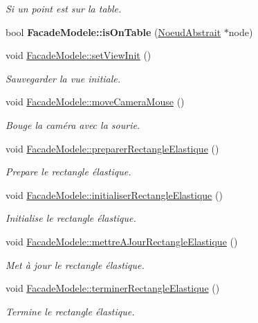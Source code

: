 \begin{DoxyCompactItemize}
\begin{DoxyCompactList}\small\item\em Si un point est sur la table. \end{DoxyCompactList}\item 
\hypertarget{group__inf2990_ga842a9426f91665baed35ec654cec6a20}{bool {\bfseries Facade\-Modele\-::is\-On\-Table} (\hyperlink{class_noeud_abstrait}{Noeud\-Abstrait} $\ast$node)}\label{group__inf2990_ga842a9426f91665baed35ec654cec6a20}

\item 
void \hyperlink{group__inf2990_gab3bc1f3520b17ed3d19287f3d411dd82}{Facade\-Modele\-::set\-View\-Init} ()
\begin{DoxyCompactList}\small\item\em Sauvegarder la vue initiale. \end{DoxyCompactList}\item 
void \hyperlink{group__inf2990_gaba7107809948a77f8ef3bf2240bc2bc4}{Facade\-Modele\-::move\-Camera\-Mouse} ()
\begin{DoxyCompactList}\small\item\em Bouge la caméra avec la sourie. \end{DoxyCompactList}\item 
void \hyperlink{group__inf2990_gaa5ea001f334158926e6c701478926ae9}{Facade\-Modele\-::preparer\-Rectangle\-Elastique} ()
\begin{DoxyCompactList}\small\item\em Prepare le rectangle élastique. \end{DoxyCompactList}\item 
void \hyperlink{group__inf2990_ga6ccf25bd92d3bae6dfeebaf051c768f4}{Facade\-Modele\-::initialiser\-Rectangle\-Elastique} ()
\begin{DoxyCompactList}\small\item\em Initialise le rectangle élastique. \end{DoxyCompactList}\item 
void \hyperlink{group__inf2990_ga382ae0540038d9ef65673af9d5d1b164}{Facade\-Modele\-::mettre\-A\-Jour\-Rectangle\-Elastique} ()
\begin{DoxyCompactList}\small\item\em Met à jour le rectangle élastique. \end{DoxyCompactList}\item 
void \hyperlink{group__inf2990_ga1c99d4d88f05b70a20b36b51c07f31cf}{Facade\-Modele\-::terminer\-Rectangle\-Elastique} ()
\begin{DoxyCompactList}\small\item\em Termine le rectangle élastique. \end{DoxyCompactList}\item 

\end{DoxyCompactItemize}
